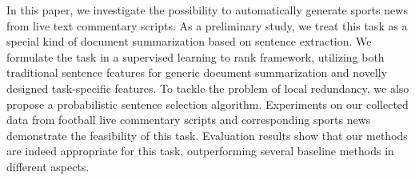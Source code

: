 In this paper, we investigate the possibility to automatically generate sports news from live text commentary scripts. As a preliminary study, we treat this task as a special kind of document summarization based on sentence extraction. We formulate the task in a supervised learning to rank framework, utilizing both traditional sentence features for generic document summarization and novelly designed task-specific features. To tackle the problem of local redundancy, we also propose a probabilistic sentence selection algorithm. Experiments on our collected data from football live commentary scripts and corresponding sports news demonstrate the feasibility of this task. Evaluation results show that our methods are indeed appropriate for this task, outperforming several baseline methods in different aspects.
